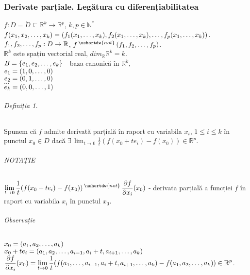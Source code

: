\part{}

\section{Derivate parțiale. Legătura cu diferențiabilitatea}
$f:D=\mathring{D} \subseteq \mathbb{R}^{k} \rightarrow \mathbb{R}^{p}$, $k, p \in \mathbb{N}^{*}$ \\[7pt]
$f(x_{1}, x_{2}, \mathellipsis, x_{k}) = (f_{1}(x_{1}, \mathellipsis, x_{k}), f_{2}(x_{1}, \mathellipsis, x_{k}), \mathellipsis, f_{p}(x_{1}, \mathellipsis, x_{k}))$. \\
$f_{1}, f_{2}, \mathellipsis, f_{p}:D \rightarrow \mathbb{R}$, $f \, ^{\ushortdw{not}} \, (f_{1}, f_{2}, \mathellipsis, f_{p})$. \\[7pt]
$\mathbb{R}^{k}$ este spațiu vectorial real, $dim_{\mathbb{R}} \mathbb{R}^{k} = k$. \\[7pt]
$B = \{e_{1}, e_{2}, \mathellipsis, e_{k} \}$ - baza canonică în $\mathbb{R}^{k}$, \\
$e_{1} = (1, 0, \mathellipsis, 0)$ \\
$e_{2} = (0, 1, \mathellipsis, 0)$ \\
$\ldots$ \\
$e_{k} = (0, 0, \mathellipsis, 1)$

\paragraph{Definiția 1.}
Spunem că $f$ admite derivată parțială în raport cu variabila $x_{i}$, $1 \leq i \leq k$ în punctul $x_{0} \in D$ dacă
$\exists \, \displaystyle\lim_{t \rightarrow 0} \displaystyle\frac{1}{t} (f(x_{0} + te_{i}) - f(x_{0})) \in \mathbb{R}^{p}$.

\paragraph{NOTAȚIE}
$\displaystyle\lim_{t \rightarrow 0} \displaystyle\frac{1}{t} (f(x_{0} + te_{i}) - f(x_{0})) \, ^{\ushortdw{not}} \,
\displaystyle\frac{\partial f}{\partial x_{i}}(x_{0})$ - derivata parțială a funcției $f$ în raport cu variabila $x_{i}$ în
punctul $x_{0}$.

\paragraph{Observație}
$x_{0} = (a_{1}, a_{2}, \mathellipsis, a_{k})$ \\
$x_{0} + te_{i} = (a_{1}, a_{2}, \mathellipsis, a_{i-1}, a_{i}+t, a_{i+1}, \mathellipsis, a_{k})$ \\[8pt]
$\displaystyle\frac{\partial f}{\partial x_{i}}(x_{0}) = 
\displaystyle\lim_{t \rightarrow 0} \displaystyle\frac{1}{t}(f(a_{1}, \mathellipsis, a_{i-1}, a_{i}+t, a_{i+1}, \mathellipsis, a_{k}) -
f(a_{1}, a_{2}, \mathellipsis, a_{k})) \in \mathbb{R}^{p}$.

